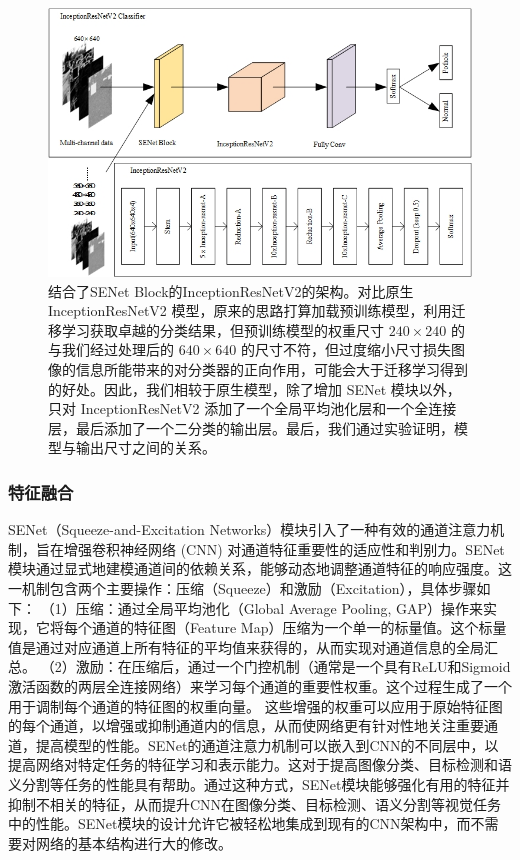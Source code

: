 \documentclass[a4paper, 10pt]{article}
\begin{document}
	\begin{figure}[htb]
		\centering 
		\includegraphics[width=0.8\columnwidth]{picture/InceptionResNetV2}
		\caption{
			\label{fig: InceptionResNetV2 Architecture} 
			结合了SENet Block的InceptionResNetV2的架构。对比原生 InceptionResNetV2 模型，原来的思路打算加载预训练模型，利用迁移学习获取卓越的分类结果，但预训练模型的权重尺寸 $240\times 240$ 的与我们经过处理后的 $640 \times 640$ 的尺寸不符，但过度缩小尺寸损失图像的信息所能带来的对分类器的正向作用，可能会大于迁移学习得到的好处。因此，我们相较于原生模型，除了增加 SENet 模块以外，只对 InceptionResNetV2 添加了一个全局平均池化层和一个全连接层，最后添加了一个二分类的输出层。最后，我们通过实验证明，模型与输出尺寸之间的关系。
		}
	\end{figure}
	
	\subsubsection{特征融合}
	
	SENet（Squeeze-and-Excitation Networks）模块引入了一种有效的通道注意力机制，旨在增强卷积神经网络 (CNN) 对通道特征重要性的适应性和判别力。SENet模块通过显式地建模通道间的依赖关系，能够动态地调整通道特征的响应强度。这一机制包含两个主要操作：压缩（Squeeze）和激励（Excitation），具体步骤如下：
	（1）压缩：通过全局平均池化（Global Average Pooling, GAP）操作来实现，它将每个通道的特征图（Feature Map）压缩为一个单一的标量值。这个标量值是通过对应通道上所有特征的平均值来获得的，从而实现对通道信息的全局汇总。
	（2）激励：在压缩后，通过一个门控机制（通常是一个具有ReLU和Sigmoid激活函数的两层全连接网络）来学习每个通道的重要性权重。这个过程生成了一个用于调制每个通道的特征图的权重向量。
	这些增强的权重可以应用于原始特征图的每个通道，以增强或抑制通道内的信息，从而使网络更有针对性地关注重要通道，提高模型的性能\cite{8314460}。SENet的通道注意力机制可以嵌入到CNN的不同层中，以提高网络对特定任务的特征学习和表示能力。这对于提高图像分类、目标检测和语义分割等任务的性能具有帮助。通过这种方式，SENet模块能够强化有用的特征并抑制不相关的特征，从而提升CNN在图像分类、目标检测、语义分割等视觉任务中的性能\cite{rs15112728}。SENet模块的设计允许它被轻松地集成到现有的CNN架构中，而不需要对网络的基本结构进行大的修改。
	
\end{document}
